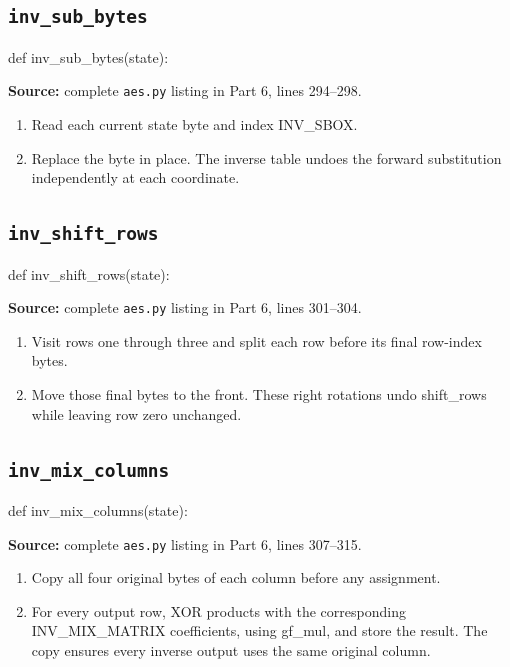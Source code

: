 \subsection{\texttt{inv\_\allowbreak{}sub\_\allowbreak{}bytes}}
\begin{lightcode}
def inv_sub_bytes(state):
\end{lightcode}
\noindent\textbf{Source:} complete \texttt{aes.py} listing in Part 6, lines 294--298.
\begin{enumerate}
\item Read each current state byte and index INV\_SBOX.
\item Replace the byte in place. The inverse table undoes the forward substitution independently at each coordinate.
\end{enumerate}
\subsection{\texttt{inv\_\allowbreak{}shift\_\allowbreak{}rows}}
\begin{lightcode}
def inv_shift_rows(state):
\end{lightcode}
\noindent\textbf{Source:} complete \texttt{aes.py} listing in Part 6, lines 301--304.
\begin{enumerate}
\item Visit rows one through three and split each row before its final row-index bytes.
\item Move those final bytes to the front. These right rotations undo shift\_rows while leaving row zero unchanged.
\end{enumerate}
\subsection{\texttt{inv\_\allowbreak{}mix\_\allowbreak{}columns}}
\begin{lightcode}
def inv_mix_columns(state):
\end{lightcode}
\noindent\textbf{Source:} complete \texttt{aes.py} listing in Part 6, lines 307--315.
\begin{enumerate}
\item Copy all four original bytes of each column before any assignment.
\item For every output row, XOR products with the corresponding INV\_MIX\_MATRIX coefficients, using gf\_mul, and store the result. The copy ensures every inverse output uses the same original column.
\end{enumerate}
